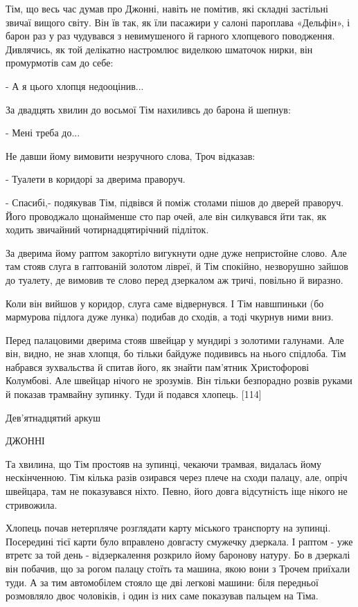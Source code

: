 Тім, що весь час думав про Джонні, навіть не помітив, які складні застільні звичаї вищого світу. Він їв так, як їли пасажири у салоні пароплава «Дельфін», і барон раз у раз чудувався з невимушеного й гарного хлопцевого поводження. Дивлячись, як той делікатно настромлює виделкою шматочок нирки, він промурмотів сам до себе:

- А я цього хлопця недооцінив...

За двадцять хвилин до восьмої Тім нахиливсь до барона й шепнув:

- Мені треба до...

Не давши йому вимовити незручного слова, Троч відказав:

- Туалети в коридорі за дверима праворуч.

- Спасибі,- подякував Тім, підвівся й поміж столами пішов до дверей праворуч. Його проводжало щонайменше сто пар очей, але він силкувався йти так, як ходить звичайний чотирнадцятирічний підліток.

За дверима йому раптом закортіло вигукнути одне дуже непристойне слово. Але там стояв слуга в гаптованій золотом лівреї, й Тім спокійно, незворушно зайшов до туалету, де вимовив те слово перед дзеркалом аж тричі, повільно й виразно.

Коли він вийшов у коридор, слуга саме відвернувся. І Тім навшпиньки (бо мармурова підлога дуже лунка) подибав до сходів, а тоді чкурнув ними вниз.

Перед палацовими дверима стояв швейцар у мундирі з золотими галунами. Але він, видно, не знав хлопця, бо тільки байдуже подививсь на нього спідлоба. Тім набрався зухвальства й спитав його, як знайти пам'ятник Христофорові Колумбові. Але швейцар нічого не зрозумів. Він тільки безпорадно розвів руками й показав трамвайну зупинку. Туди й подався хлопець. [114]

Дев'ятнадцятий аркуш

ДЖОННІ

Та хвилина, що Тім простояв на зупинці, чекаючи трамвая, видалась йому нескінченною. Тім кілька разів озирався через плече на сходи палацу, але, опріч швейцара, там не показувався ніхто. Певно, його довга відсутність іще нікого не стривожила.

Хлопець почав нетерпляче розглядати карту міського транспорту на зупинці. Посередині тієї карти було вправлено довгасту смужечку дзеркала. І раптом - уже втретє за той день - відзеркалення розкрило йому баронову натуру. Бо в дзеркалі він побачив, що за рогом палацу стоїть та машина, якою вони з Трочем приїхали туди. А за тим автомобілем стояло ще дві легкові машини: біля передньої розмовляло двоє чоловіків, і один із них саме показував пальцем на Тіма.

